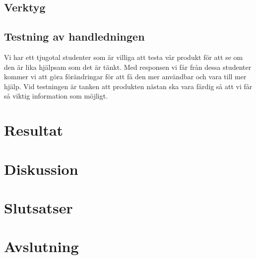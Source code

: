 \documentclass[]{article}
\begin{document}
\subsection{Verktyg}%

\subsection{Testning av handledningen}

Vi har ett tjugotal studenter som är villiga att testa vår produkt för
att se om den är lika hjälpsam som det är tänkt. Med responsen vi får
från dessa studenter kommer vi att göra förändringar för att få den mer
användbar och vara till mer hjälp. Vid testningen är tanken att
produkten nästan ska vara färdig så att vi får så viktig information som
möjligt.

\section{Resultat}

%

\section{Diskussion}


\section{Slutsatser}

\section{Avslutning}

%

\newpage

\printbibliography
\end{document}
